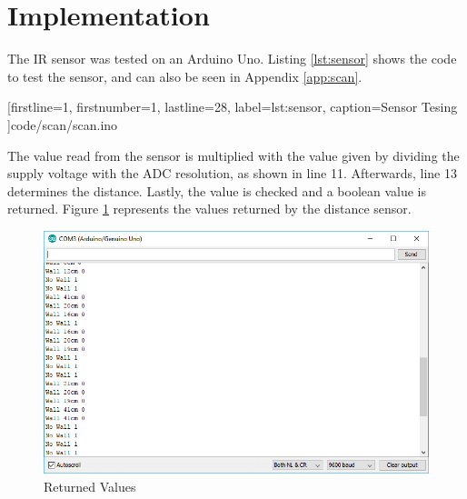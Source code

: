 \newpage
\section{Implementation}\label{sec:scan_implementation}
The IR sensor was tested on an Arduino Uno. Listing \ref{lst:sensor} 
shows the code to test the sensor, and can also be seen in Appendix
\ref{app:scan}.


[firstline=1,
firstnumber=1,
lastline=28,		
label=lst:sensor,
caption={Sensor Tesing}
]{code/scan/scan.ino}

The value read from the sensor is multiplied with the value given by
dividing the supply voltage with the ADC resolution, as shown in line 11.
Afterwards, line 13 determines the distance.
Lastly, the value is checked and a boolean value is returned.
\clearpage
Figure \ref{fig:arduino_values} represents the values returned by the
distance sensor.

\begin{figure}[htp]
	\centering
	\includegraphics[width=\textwidth]{figures/scan/SerialCom.png}
	\caption{Returned Values}
	\label{fig:arduino_values}
\end{figure}